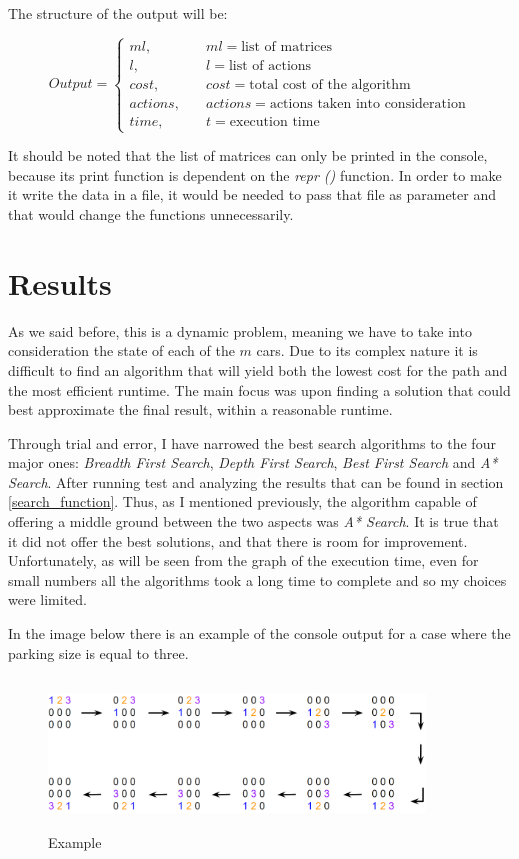 \documentclass{article}
\begin{document}
The structure of the output will be:

\[ Output =
  \begin{cases}
    ml, & \quad ml=\text{list of matrices}\\
    l, & \quad l=\text{list of actions}\\
    cost, & \quad cost=\text{total cost of the algorithm}\\
    actions, & \quad actions=\text{actions taken into consideration}\\
    time, & \quad t=\text{execution time}
  \end{cases}
\]

It should be noted that the list of matrices can only be printed in the console, because its print function is dependent on the \emph{\textunderscore \textunderscore repr \textunderscore \textunderscore()} function. In order to make it write the data in a file, it would be needed to pass that file as parameter and that would change the functions unnecessarily. 

\section{Results}
As we said before, this is a dynamic problem, meaning we have to take into consideration the state of each of the $m$ cars. Due to its complex nature it is difficult to find an algorithm that will yield both the lowest cost for the path and the most efficient runtime.  The main focus was upon finding a solution that could best approximate the final result, within a reasonable runtime. 

Through trial and error, I have narrowed the best search algorithms to the four major ones: \emph{Breadth First Search}, \emph{Depth First Search}, \emph{Best First Search} and \emph{A* Search}. After running test and analyzing the results that can be found in section \ref{search_function}. Thus, as I mentioned previously, the algorithm capable of offering a middle ground between the two aspects was \emph{A* Search}. It is true that it did not offer the best solutions, and that there is room for improvement. Unfortunately, as will be seen from the graph of the execution time, even for small numbers all the algorithms took a long time to complete and so my choices were limited.

In the image below there is an example of the console output for a case where the parking size is equal to three.

\begin{figure}[htp]
         \centering
             \includegraphics[width=10cm,height=4cm]{Images/exemplu.PNG}
             \caption{Example}
             \label{fig:example}
        \end{figure}
\end{document}
